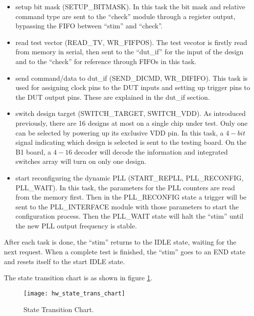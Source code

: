 \begin{itemize}
 \item setup bit mask (SETUP\_BITMASK). In this task the bit mask and relative command type are sent to the ``check'' module through a register output, bypassing the FIFO between ``stim'' and ``check''.

 \item read test vector (READ\_TV, WR\_FIFPOS). The test vecotor is firstly read from memory in serial, then sent to the ``dut\_if'' for the input of the design and to the ``check'' for reference through FIFOs in this task.

 \item send command/data to dut\_if (SEND\_DICMD, WR\_DIFIFO). This task is used for assigning clock pins to the DUT inputs and setting up trigger pins to the DUT output pins. These are explained in the dut\_if section.

 \item switch design target (SWITCH\_TARGET, SWITCH\_VDD). As introduced previously, there are 16 designs at most on a single chip under test. Only one can be selected by powering up its exclusive VDD pin. In this task, a $4-bit$ signal indicating which design is selected is sent to the testing board. On the B1 board, a $4-16$ decoder will decode the information and integrated switches array will turn on only one design.

 \item start reconfiguring the dynamic PLL (START\_REPLL, PLL\_RECONFIG, PLL\_WAIT). In this task, the parameters for the PLL counters are read from the memory first. Then in the PLL\_RECONFIG state a trigger will be sent to the PLL\_INTERFACE module with those parameters to start the configuration process. Then the PLL\_WAIT state will halt the ``stim'' until the new PLL output frequency is stable.
\end{itemize}

After each task is done, the ``stim'' returns to the IDLE state, waiting for the next request. When a complete test is finished, the ``stim'' goes to an END state and resets itself to the start IDLE state.

The state transition chart is as shown in figure \ref{fig:hw_state_trans_chart}.

\begin{figure}
 \centering
 \texttt{[image: hw\_state\_trans\_chart]}
 \caption{State Transition Chart.}
 \label{fig:hw_state_trans_chart}
\end{figure}

